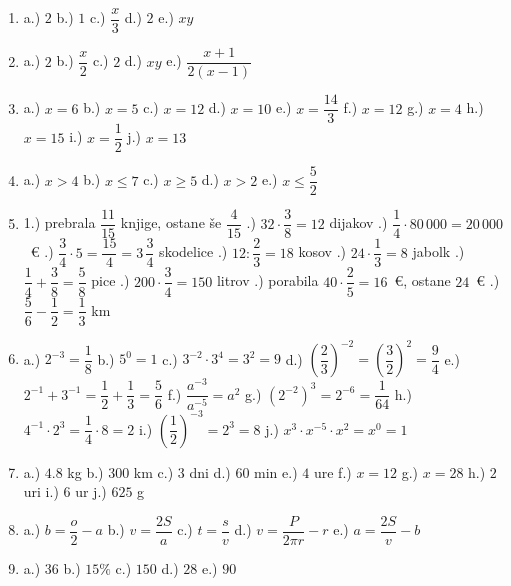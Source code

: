 \documentclass[a4paper,12pt]{letter}
\begin{document}
\begin{enumerate}
\item a.) $2$ \quad b.) $1$ \quad c.) $\dfrac{x}{3}$ \quad d.) $2$ \quad e.) $xy$

\item a.) $2$ \quad b.) $\dfrac{x}{2}$ \quad c.) $2$ \quad d.) $xy$ \quad e.) $\dfrac{x+1}{2(x-1)}$

\item a.) $x=6$ \quad b.) $x=5$ \quad c.) $x=12$ \quad d.) $x=10$ \quad e.) $x=\dfrac{14}{3}$ \quad
      f.) $x=12$ \quad g.) $x=4$ \quad h.) $x=15$ \quad i.) $x=\dfrac{1}{2}$ \quad j.) $x=13$

\item a.) $x>4$ \quad b.) $x\le7$ \quad c.) $x\ge5$ \quad d.) $x>2$ \quad e.) $x\le\dfrac{5}{2}$

\item 1.) prebrala $\dfrac{11}{15}$ knjige, ostane \v{s}e $\dfrac{4}{15}$ .) $32\cdot\dfrac{3}{8}=12$ dijakov .) $\dfrac{1}{4}\cdot80\,000=20\,000$~\euro{} .) $\dfrac{3}{4}\cdot5=\dfrac{15}{4}=3\,\dfrac{3}{4}$ skodelice .) $12:\dfrac{2}{3}=18$ kosov .) $24\cdot\dfrac{1}{3}=8$ jabolk .) $\dfrac{1}{4}+\dfrac{3}{8}=\dfrac{5}{8}$ pice .) $200\cdot\dfrac{3}{4}=150$ litrov .) porabila $40\cdot\dfrac{2}{5}=16$~\euro{}, ostane $24$~\euro{} .) $\dfrac{5}{6}-\dfrac{1}{2}=\dfrac{1}{3}$ km

\item a.) $2^{-3}=\dfrac{1}{8}$ \quad b.) $5^0=1$ \quad c.) $3^{-2}\cdot3^4=3^2=9$ \quad
      d.) $\left(\dfrac{2}{3}\right)^{-2}=\left(\dfrac{3}{2}\right)^2=\dfrac{9}{4}$ \quad
      e.) $2^{-1}+3^{-1}=\dfrac{1}{2}+\dfrac{1}{3}=\dfrac{5}{6}$ \quad f.) $\dfrac{a^{-3}}{a^{-5}}=a^2$ \quad
      g.) $(2^{-2})^3=2^{-6}=\dfrac{1}{64}$ \quad h.) $4^{-1}\cdot2^3=\dfrac{1}{4}\cdot8=2$ \quad
      i.) $\left(\dfrac{1}{2}\right)^{-3}=2^3=8$ \quad j.) $x^3\cdot x^{-5}\cdot x^2=x^0=1$

\item a.) $4.8$ kg \quad b.) $300$ km \quad c.) $3$ dni \quad d.) $60$ min \quad e.) $4$ ure \quad
      f.) $x=12$ \quad g.) $x=28$ \quad h.) $2$ uri \quad i.) $6$ ur \quad j.) $625$ g

\item a.) $b=\dfrac{o}{2}-a$ \quad b.) $v=\dfrac{2S}{a}$ \quad c.) $t=\dfrac{s}{v}$ \quad
      d.) $v=\dfrac{P}{2\pi r}-r$ \quad e.) $a=\dfrac{2S}{v}-b$

\item a.) $36$ \quad b.) $15\%$ \quad c.) $150$ \quad d.) $28$ \quad e.) $90$


\end{enumerate}
\end{document}
